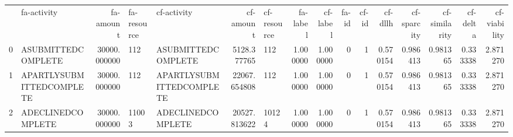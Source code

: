\begin{tabular}{llrllrlrrrrrrrrr}
 & fa-activity & fa-amount & fa-resource & cf-activity & cf-amount & cf-resource & fa-label & cf-label & fa-id & cf-id & cf-dllh & cf-sparcity & cf-similarity & cf-delta & cf-viability \\
0 & A\-SUBMITTED\-COMPLETE & 30000.000000 & 112 & A\-SUBMITTED\-COMPLETE & 5128.377765 & 112 & 1.000000 & 1.000000 & 0 & 1 & 0.570154 & 0.986413 & 0.981365 & 0.333338 & 2.871270 \\
1 & A\-PARTLYSUBMITTED\-COMPLETE & 30000.000000 & 112 & A\-PARTLYSUBMITTED\-COMPLETE & 22067.654808 & 112 & 1.000000 & 1.000000 & 0 & 1 & 0.570154 & 0.986413 & 0.981365 & 0.333338 & 2.871270 \\
2 & A\-DECLINED\-COMPLETE & 30000.000000 & 11003 & A\-DECLINED\-COMPLETE & 20527.813622 & 10124 & 1.000000 & 1.000000 & 0 & 1 & 0.570154 & 0.986413 & 0.981365 & 0.333338 & 2.871270 \\
\end{tabular}
